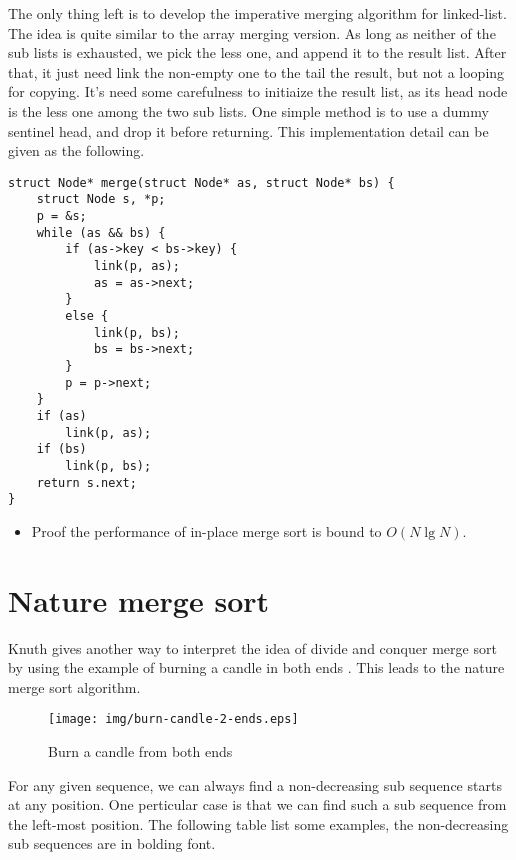 \documentclass{article}
\begin{document}
The only thing left is to develop the imperative merging algorithm for linked-list. The idea
is quite similar to the array merging version. As long as neither of the sub lists is exhausted,
we pick the less one, and append it to the result list. After that, it just need link the
non-empty one to the tail the result, but not a looping for copying. It's need some carefulness
to initiaize the result list, as its head node is the less one among the two sub lists.
One simple method is to use a dummy sentinel head, and drop it before returning. This implementation
detail can be given as the following.

\lstset{language=C}
\begin{lstlisting}
struct Node* merge(struct Node* as, struct Node* bs) {
    struct Node s, *p;
    p = &s;
    while (as && bs) {
        if (as->key < bs->key) {
            link(p, as);
            as = as->next;
        }
        else {
            link(p, bs);
            bs = bs->next;
        }
        p = p->next;
    }
    if (as)
        link(p, as);
    if (bs)
        link(p, bs);
    return s.next;
}  
\end{lstlisting}

\begin{Exercise}
\begin{itemize}
\item Proof the performance of in-place merge sort is bound to $O(N \lg N)$.
\end{itemize}
\end{Exercise}

\section{Nature merge sort}
Knuth gives another way to interpret the idea of divide and conquer merge sort by using the example
of burning a candle in both ends \cite{TAOCP}. This leads to the nature merge sort algorithm.

\begin{figure}[htbp]
 \centering
 \texttt{[image: img/burn-candle-2-ends.eps]}
 \caption{Burn a candle from both ends}
 \label{fig:burn-candle}
\end{figure}

For any given sequence, we can always find a non-decreasing sub sequence starts at any position.
One perticular case is that we can find such a sub sequence from the left-most position. The following
table list some examples, the non-decreasing sub sequences are in bolding font.
\end{document}
